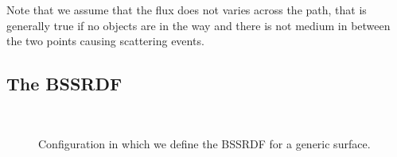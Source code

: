 Note that we assume that the flux does not varies across the path, that is generally true if no objects are in the way and there is not medium in between the two points causing scattering events. 

\subsection{The BSSRDF}

\begin{figure}
\centering
   \def\svgwidth{0.8\textwidth}
    \\
\caption{Configuration in which we define the BSSRDF for a generic surface.} %
\label{fig:bssrdf_configuration}
\end{figure}


